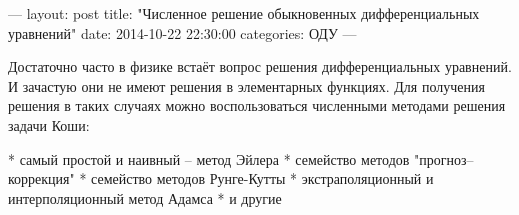 ---
layout: post
title: "Численное решение обыкновенных дифференциальных уравнений"
date:   2014-10-22 22:30:00
categories: ОДУ
---

Достаточно часто в физике встаёт вопрос решения дифференциальных уравнений.
И зачастую они не имеют решения в элементарных функциях. Для получения
решения в таких случаях можно воспользоваться численными методами решения
задачи Коши:

* самый простой и наивный -- метод Эйлера
* семейство методов "прогноз--коррекция"
* семейство методов Рунге-Кутты
* экстраполяционный и интерполяционный метод Адамса
* и другие

